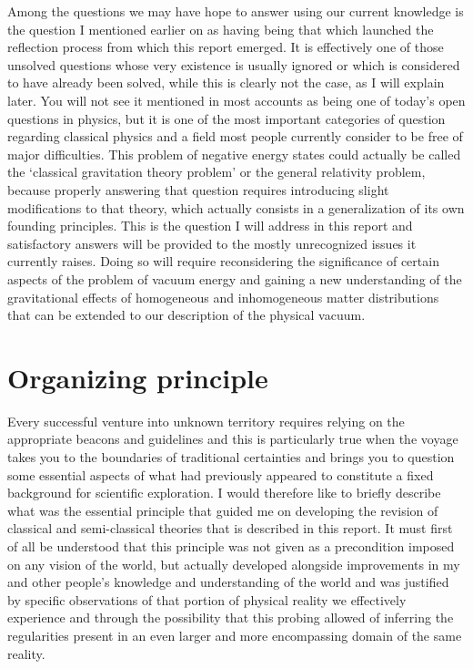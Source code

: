 \documentclass[notitlepage,12pt]{report}
\begin{document}
Among the questions we may have hope to answer using our current knowledge is the question I mentioned earlier on as having being that which launched the reflection process from which this report emerged. It is effectively one of those unsolved questions whose very existence is usually ignored or which is considered to have already been solved, while this is clearly not the case, as I will explain later. You will not see it mentioned in most accounts as being one of today's open questions in physics, but it is one of the most important categories of question regarding classical physics and a field most people currently consider to be free of major difficulties. This problem of negative energy states could actually be called the `classical gravitation theory problem' or the general relativity problem, because properly answering that question requires introducing slight modifications to that theory, which actually consists in a generalization of its own founding principles. This is the question I will address in this report and satisfactory answers will be provided to the mostly unrecognized issues it currently raises. Doing so will require reconsidering the significance of certain aspects of the problem of vacuum energy and gaining a new understanding of the gravitational effects of homogeneous and inhomogeneous matter distributions that can be extended to our description of the physical vacuum.

\section{Organizing principle}

Every successful venture into unknown territory requires relying on the appropriate beacons and guidelines and this is particularly true when the voyage takes you to the boundaries of traditional certainties and brings you to question some essential aspects of what had previously appeared to constitute a fixed background for scientific exploration. I would therefore like to briefly describe what was the essential principle that guided me on developing the revision of classical and semi-classical theories that is described in this report. It must first of all be understood that this principle was not given as a precondition imposed on any vision of the world, but actually developed alongside improvements in my and other people's knowledge and understanding of the world and was justified by specific observations of that portion of physical reality we effectively experience and through the possibility that this probing allowed of inferring the regularities present in an even larger and more encompassing domain of the same reality.
\end{document}
